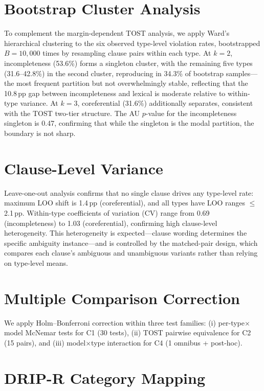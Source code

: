 \section{Bootstrap Cluster Analysis}
\label{app:cluster}

To complement the margin-dependent TOST analysis, we apply Ward's hierarchical clustering to the six observed type-level violation rates, bootstrapped $B = 10{,}000$ times by resampling clause pairs within each type. At $k = 2$, incompleteness (53.6\%) forms a singleton cluster, with the remaining five types (31.6--42.8\%) in the second cluster, reproducing in 34.3\% of bootstrap samples---the most frequent partition but not overwhelmingly stable, reflecting that the 10.8\,pp gap between incompleteness and lexical is moderate relative to within-type variance. At $k = 3$, coreferential (31.6\%) additionally separates, consistent with the TOST two-tier structure. The AU $p$-value for the incompleteness singleton is 0.47, confirming that while the singleton is the modal partition, the boundary is not sharp.

\section{Clause-Level Variance}
\label{app:clause_variance}

Leave-one-out analysis confirms that no single clause drives any type-level rate: maximum LOO shift is 1.4\,pp (coreferential), and all types have LOO ranges $\leq$2.1\,pp. Within-type coefficients of variation (CV) range from 0.69 (incompleteness) to 1.03 (coreferential), confirming high clause-level heterogeneity. This heterogeneity is expected---clause wording determines the specific ambiguity instance---and is controlled by the matched-pair design, which compares each clause's ambiguous and unambiguous variants rather than relying on type-level means.

\section{Multiple Comparison Correction}
\label{app:multiple_comparison}

We apply Holm--Bonferroni correction within three test families: (i) per-type$\times$model McNemar tests for C1 (30 tests), (ii) TOST pairwise equivalence for C2 (15 pairs), and (iii) model$\times$type interaction for C4 (1 omnibus + post-hoc).

\section{DRIP-R Category Mapping}
\label{app:drip_mapping}

